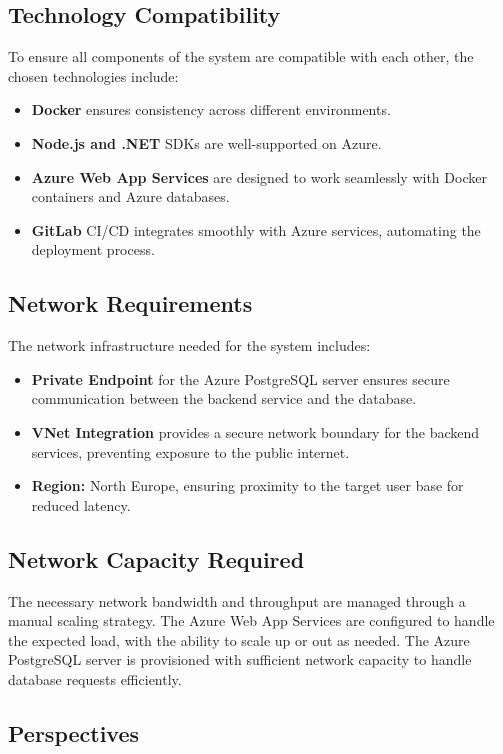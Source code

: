 \subsection{Technology Compatibility}
To ensure all components of the system are compatible with each other, the chosen technologies include:
\begin{itemize}
    \item \textbf{Docker} ensures consistency across different environments.
    \item \textbf{Node.js and .NET} SDKs are well-supported on Azure.
    \item \textbf{Azure Web App Services} are designed to work seamlessly with Docker containers and Azure databases.
    \item \textbf{GitLab} CI/CD integrates smoothly with Azure services, automating the deployment process.
\end{itemize}

\subsection{Network Requirements}
The network infrastructure needed for the system includes:
\begin{itemize}
    \item \textbf{Private Endpoint} for the Azure PostgreSQL server ensures secure communication between the backend service and the database.
    \item \textbf{VNet Integration} provides a secure network boundary for the backend services, preventing exposure to the public internet.
    \item \textbf{Region:} North Europe, ensuring proximity to the target user base for reduced latency.
\end{itemize}

\subsection{Network Capacity Required}
The necessary network bandwidth and throughput are managed through a manual scaling strategy. The Azure Web App Services are configured to handle the expected load, with the ability to scale up or out as needed. The Azure PostgreSQL server is provisioned with sufficient network capacity to handle database requests efficiently.

\subsection{Perspectives}

